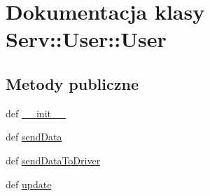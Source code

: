 \hypertarget{class_serv_1_1_user_1_1_user}{
\section{Dokumentacja klasy Serv::User::User}
\label{class_serv_1_1_user_1_1_user}
}
\subsection*{Metody publiczne}
\begin{DoxyCompactItemize}
\item 
def \hyperlink{class_serv_1_1_user_1_1_user_ae503b7d48b7eb7c8a399f2652a3ff002}{\_\-\_\-init\_\-\_\-}
\item 
def \hyperlink{class_serv_1_1_user_1_1_user_a2d0441db55283b641079acb8bf67c30a}{sendData}
\item 
def \hyperlink{class_serv_1_1_user_1_1_user_a0907f262b618e5b6c05c6e3584e24b44}{sendDataToDriver}
\item 
def \hyperlink{class_serv_1_1_user_1_1_user_a90697aec786a688ec3308b3ebdcc83a3}{update}
\end{DoxyCompactItemize}
